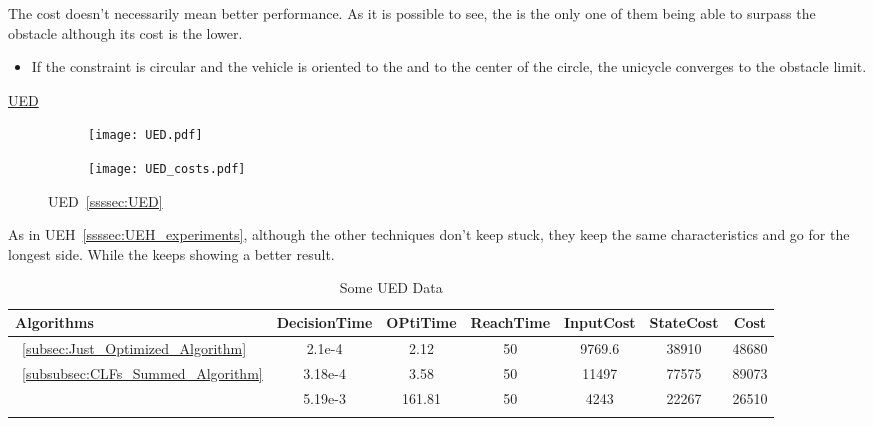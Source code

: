 
 The cost doesn't necessarily mean better performance. As it is possible to see, the  is the only one of them being able to surpass the obstacle although its cost is the lower.

\begin{tcolorbox}[colback=blue!5!white,colframe=blue!35!white,title=Notes:]
\begin{itemize}
    \item If the constraint is circular and the vehicle is oriented to the \txtref and to the center of the circle, the unicycle converges to the obstacle limit.
  \end{itemize}
\end{tcolorbox} 

\newpage %

\underline{UED}
\label{UED_experiments} %

 \begin{figure}[htbp]
  \begin{subfigure}{0.5\textwidth}
    \centering
    \texttt{[image: UED.pdf]}
  \label{fig:UED_CostEvol}
  \end{subfigure}
  \begin{subfigure}{0.6\textwidth}
    \centering
    \texttt{[image: UED\_costs.pdf]}
  \label{fig:UED_trajectory}
  \end{subfigure}
  \caption{UED~\ref{ssssec:UED}}
\label{fig:UEDTrajectory_and_CostEvol}
\end{figure}


As in UEH~\ref{ssssec:UEH_experiments}, although the other techniques don't keep stuck, they keep the same characteristics and go for the longest side. While the  keeps showing a better result.


  \bgroup
 \begin{xltabular}{\textwidth}{|l|cccccc|}
   \toprule
   Algorithms   & DecisionTime & OPtiTime & ReachTime  & InputCost   & StateCost & Cost           \\
   \midrule
    ~\ref{subsec:Just_Optimized_Algorithm}           & 2.1e-4  & 2.12 & 50 & 9769.6 & 38910  & 48680 \\
    ~\ref{subsubsec:CLFs_Summed_Algorithm}        & 3.18e-4 & 3.58 & 50 & 11497 & 77575 & 89073  \\
                                                      & 5.19e-3 & 161.81& 50  & 4243 & 22267 & 26510 \\
    \midrule
    \caption{Some UED Data}
    \label{tab:Some_UED_Data}\\
   \end{xltabular}
 \egroup

